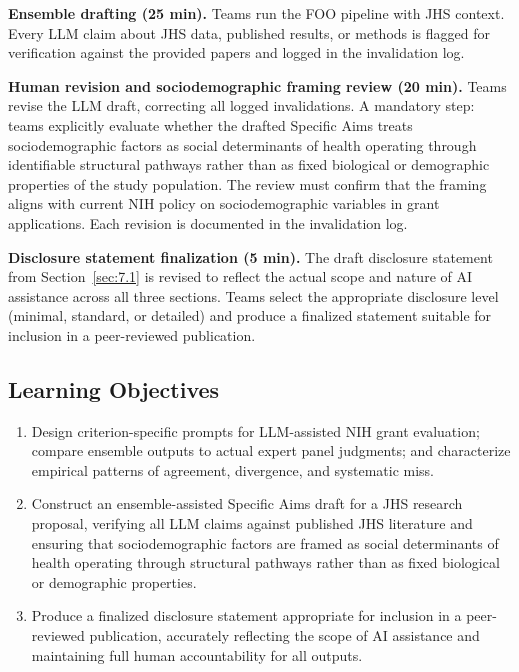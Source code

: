 \textbf{Ensemble drafting (25 min).} Teams run the FOO pipeline
with JHS context. Every LLM claim about JHS data, published
results, or methods is flagged for verification against the
provided papers and logged in the invalidation log.

\textbf{Human revision and sociodemographic framing
review (20 min).}
Teams revise the LLM draft, correcting all logged invalidations.
A mandatory step: teams explicitly evaluate whether the drafted
Specific Aims treats sociodemographic factors as social determinants of health operating through
identifiable structural pathways rather than as fixed biological
or demographic properties of the study population. The review must confirm
that the framing aligns with current NIH policy on sociodemographic variables 
in grant applications. Each revision is documented in the invalidation log.

\textbf{Disclosure statement finalization (5 min).} The draft
disclosure statement from Section~\ref{sec:7.1} is revised to
reflect the actual scope and nature of AI assistance across all
three sections. Teams select the appropriate disclosure level
(minimal, standard, or detailed) and produce a finalized
statement suitable for inclusion in a peer-reviewed publication.

\subsection{Learning Objectives}

\begin{enumerate}
    \item Design criterion-specific prompts for LLM-assisted NIH
    grant evaluation; compare ensemble outputs to actual expert
    panel judgments; and characterize empirical patterns of
    agreement, divergence, and systematic miss.

    \item Construct an ensemble-assisted Specific Aims draft for
    a JHS research proposal, verifying all LLM claims against
    published JHS literature and ensuring that sociodemographic
    factors are framed as social determinants of health operating through
    structural pathways rather than as fixed biological or
    demographic properties.

    \item Produce a finalized disclosure statement appropriate for
    inclusion in a peer-reviewed publication, accurately reflecting
    the scope of AI assistance and maintaining full human
    accountability for all outputs.
\end{enumerate}

